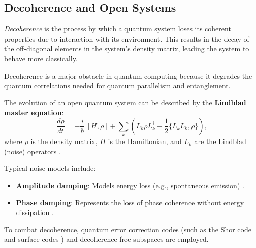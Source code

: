 \subsection{Decoherence and Open Systems}
\label{subsec:decoherence}

\begin{definition}[Decoherence]
\emph{Decoherence} is the process by which a quantum system loses its coherent properties due to interaction with its environment. This results in the decay of the off-diagonal elements in the system's density matrix, leading the system to behave more classically.
\end{definition}

\begin{remark}
Decoherence is a major obstacle in quantum computing because it degrades the quantum correlations needed for quantum parallelism and entanglement.
\end{remark}

\begin{definition}
The evolution of an open quantum system can be described by the \textbf{Lindblad master equation}:
\[
\frac{d\rho}{dt} = -\frac{i}{\hbar}\,[H, \rho] + \sum_k \left( L_k \rho L_k^\dagger - \frac{1}{2}\{L_k^\dagger L_k, \rho\} \right),
\]
where \(\rho\) is the density matrix, \(H\) is the Hamiltonian, and \(L_k\) are the Lindblad (noise) operators \cite{breuer2002theory}.
\end{definition}

\begin{example}
    Typical noise models include:
    \begin{itemize}
        \item \textbf{Amplitude damping}: Models energy loss (e.g., spontaneous emission) \cite{nielsen2010quantum}.
        \item \textbf{Phase damping}: Represents the loss of phase coherence without energy dissipation \cite{nielsen2010quantum}.
    \end{itemize}
\end{example}

\begin{observation}
    To combat decoherence, quantum error correction codes (such as the Shor code \cite{shor1995scheme} and surface codes \cite{fowler2012surface}) and decoherence-free subspaces are employed.
\end{observation}
